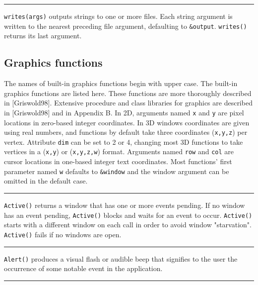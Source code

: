 \bigskip\hrule\vspace{0.1cm}

\noindent
\texttt{writes(args)} outputs strings to one or more files. Each string
argument is written to the nearest preceding file argument, defaulting
to \texttt{\&output}. \texttt{writes()} returns its
last argument.

\subsection*{Graphics functions}

The names of built-in graphics functions begin with upper case. The built-in
graphics functions are listed here. These functions are more thoroughly
described in [Griswold98]. Extensive procedure and class libraries for graphics
are described in [Griswold98] and in Appendix B.  In 2D, arguments named
\texttt{x} and \texttt{y} are pixel locations in zero-based integer
coordinates. In 3D windows coordinates are given using real numbers, and
functions by default take three coordinates (\texttt{x,y,z}) per
vertex. Attribute \texttt{dim} can be set to 2 or 4, changing most 3D functions
to take vertices in a (\texttt{x,y}) or (\texttt{x,y,z,w}) format. Arguments
named \texttt{row} and \texttt{col} are cursor locations in one-based integer
text coordinates. Most functions' first parameter named
\texttt{w} defaults to \texttt{\&window} and the window argument can be omitted
in the default case.

\bigskip\hrule\vspace{0.1cm}

\noindent
\texttt{Active()} returns a window that has one or more events pending.
If no window has an event pending, \texttt{Active()} blocks and waits
for an event to occur. \texttt{Active()} starts with a different
window on each call in order to avoid window
"starvation". \texttt{Active()} fails if
no windows are open.

\bigskip\hrule\vspace{0.1cm}

\noindent
\texttt{Alert()} produces a visual flash or audible beep that signifies
to the user the occurrence of some notable event in the application.

\bigskip\hrule\vspace{0.1cm}

